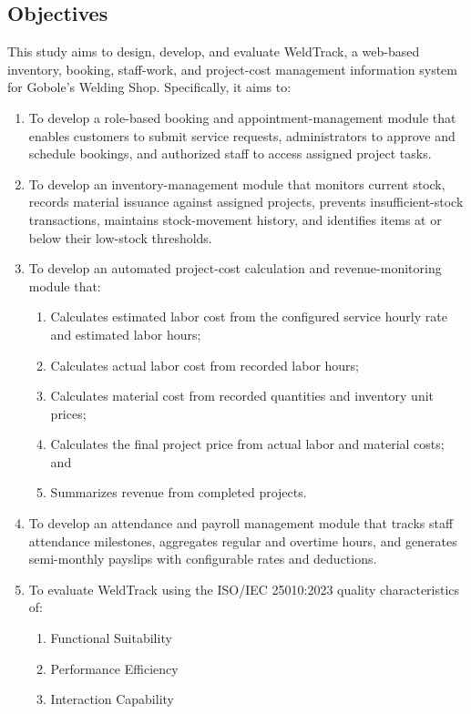 \documentclass[12pt, letterpaper]{article}
\begin{document}
\subsection{Objectives}
\hspace*{2em}This study aims to design, develop, and evaluate WeldTrack, a web-based inventory, booking, staff-work, and project-cost management information system for Gobole's Welding Shop. Specifically, it aims to:

\begin{enumerate}
    \item To develop a role-based booking and appointment-management module that enables customers to submit service requests, administrators to approve and schedule bookings, and authorized staff to access assigned project tasks.
    \item To develop an inventory-management module that monitors current stock, records material issuance against assigned projects, prevents insufficient-stock transactions, maintains stock-movement history, and identifies items at or below their low-stock thresholds.
    \item To develop an automated project-cost calculation and revenue-monitoring module that:
    \begin{enumerate}[label=\theenumi.\arabic*]
        \item Calculates estimated labor cost from the configured service hourly rate and estimated labor hours;
        \item Calculates actual labor cost from recorded labor hours;
        \item Calculates material cost from recorded quantities and inventory unit prices;
        \item Calculates the final project price from actual labor and material costs; and
        \item Summarizes revenue from completed projects.
    \end{enumerate}
    \item To develop an attendance and payroll management module that tracks staff attendance milestones, aggregates regular and overtime hours, and generates semi-monthly payslips with configurable rates and deductions.
    \item To evaluate WeldTrack using the ISO/IEC 25010:2023 quality characteristics of:
    \begin{enumerate}[label=\theenumi.\arabic*]
        \item Functional Suitability
        \item Performance Efficiency
        \item Interaction Capability
    \end{enumerate}
\end{enumerate}
\end{document}
